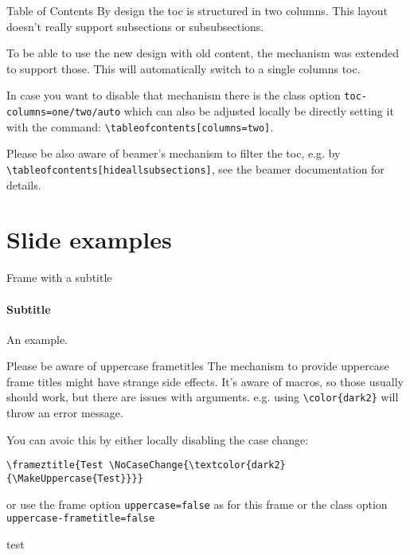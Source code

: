\documentclass[
	english, %
	design=2023, %
	]{tudabeamer}
\newcommand*{\code}[1]{\texttt{#1}}
\begin{document}
\begin{frame}{Table of Contents}
	By design the toc is structured in two columns. This layout doesn't really support subsections or subsubsections.

	To be able to use the new design with old content, the mechanism was extended to support those. This will automatically switch to a single columns toc.

	In case you want to disable that mechanism there is the class option \code{toc-columns=one/two/auto} which can also be adjusted locally be directly setting it with the command: \code{\textbackslash{}tableofcontents[columns=two]}.

	Please be also aware of beamer's mechanism to filter the toc, e.g. by \code{\textbackslash{}tableofcontents[hideallsubsections]}, see the beamer documentation for details.
\end{frame}

\section{Slide examples}

\begin{frame}{Frame with a subtitle}
	\framesubtitle{Subtitle}
	An example.
\end{frame}

\begin{frame}[fragile,uppercase=false]{Please be aware of uppercase frametitles}
	The mechanism to provide uppercase frame titles might have strange side effects.
	It's aware of macros, so those usually should work, but there are issues with arguments. e.g. using \verb+\color{dark2}+ will throw an error message.

	You can avoic this by either locally disabling the case change:

	\begin{verbatim}
\frameztitle{Test \NoCaseChange{\textcolor{dark2}{\MakeUppercase{Test}}}}
\end{verbatim}
	or use the frame option \verb+uppercase=false+ as for this frame or the class option \verb+uppercase-frametitle=false+
\end{frame}

\textcolor{TUDa-dark1}{test}

\end{document}

